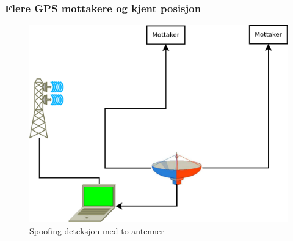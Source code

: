 \documentclass[xcolor=table]{beamer}
\begin{document}
\begin{frame} 
  \frametitle{Flere GPS mottakere og kjent posisjon}
  \begin{figure}
    \includegraphics[scale=0.2]{thesis/graphics/toantenner_2.pdf}
    \caption{Spoofing deteksjon med to antenner}
  \end{figure}
\end{frame}
\end{document}
